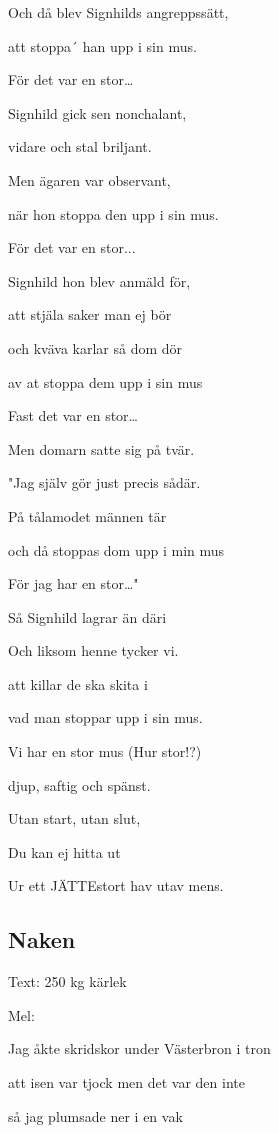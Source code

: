 Och då blev Signhilds angreppssätt,

att stoppa´ han upp i sin mus.\bigskip


För det var en stor…\bigskip


Signhild gick sen nonchalant,

vidare och stal briljant.

Men ägaren var observant,

när hon stoppa den upp i sin mus.\bigskip


För det var en stor...\bigskip


Signhild hon blev anmäld för,

att stjäla saker man ej bör

och kväva karlar så dom dör

av at stoppa dem upp i sin mus\bigskip


Fast det var en stor…\bigskip



Men domarn satte sig på tvär.

"Jag själv gör just precis sådär.

På tålamodet männen tär

och då stoppas dom upp i min mus\bigskip


För jag har en stor…"\bigskip


Så Signhild lagrar än däri

Och liksom henne tycker vi.

att killar de ska skita i

vad man stoppar upp i sin mus.\bigskip



Vi har en stor mus (Hur stor!?)

djup, saftig och spänst.

Utan start, utan slut,

Du kan ej hitta ut

Ur ett JÄTTEstort hav utav mens.\bigskip


\subsection{\textbf{Naken}}

Text: 250 kg kärlek

Mel: \bigskip

Jag åkte skridskor under Västerbron i tron 

att isen var tjock men det var den inte

så jag plumsade ner i en vak

